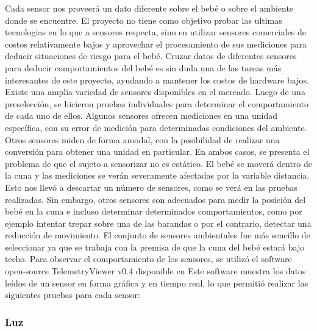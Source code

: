 \documentclass{IEEEtran}
\begin{document}
			Cada sensor nos proveerá un dato diferente sobre el bebé o sobre el ambiente donde se encuentre. El proyecto no tiene como objetivo probar las ultimas tecnologias en lo que a sensores respecta, sino en utilizar sensores comerciales de costos relativamente bajos y aprovechar el procesamiento de sus mediciones para deducir situaciones de riesgo para el bebé.
			Cruzar datos de diferentes sensores para deducir comportamientos del bebé es sin duda una de las tareas más interesantes de este proyecto, ayudando a mantener los costos de hardware bajos.
			Existe una amplia variedad de sensores disponibles en el mercado. Luego de una preselección, se hicieron pruebas individuales para determinar el comportamiento de cada uno de ellos.
			Algunos sensores ofrecen mediciones en una unidad específica, con su error de medición para determinadas condiciones del ambiente. Otros sensores miden de forma amodal, con la posibilidad de realizar una conversión para obtener una unidad en particular.
			En ambos casos, se presenta el problema de que el sujeto a sensorizar no es estático. El bebé se moverá dentro de la cuna y las mediciones se verán severamente afectadas por la variable distancia. Esto nos llevó a descartar un número de sensores, como se verá en las pruebas realizadas. Sin embargo, otros sensores son adecuados para medir la posición del bebé en la cuna e incluso determinar determinados comportamientos, como por ejemplo intentar trepar sobre una de las barandas o por el contrario, detectar una reducción de movimiento.
			El conjunto de sensores ambientales fue más sencillo de seleccionar ya que se trabaja con la premisa de que la cuna del bebé estará bajo techo.
			Para observar el comportamiento de los sensores, se utilizó el software open-source TelemetryViewer v0.4 disponible en
Este software muestra los datos leídos de un sensor en forma gráfica y en tiempo real, lo que permitió realizar las siguientes pruebas para cada sensor:

			\subsubsection{Luz}
\end{document}
